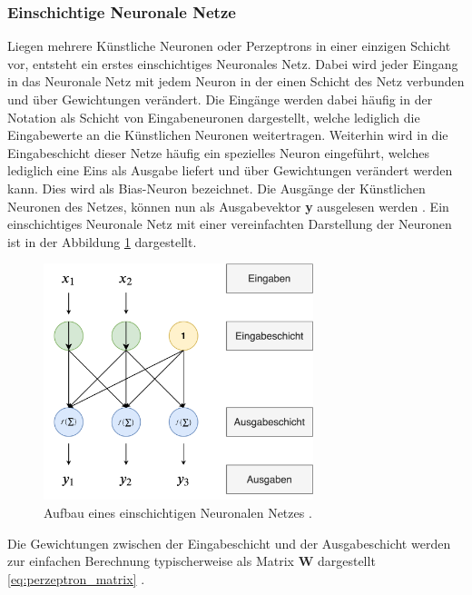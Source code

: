 \documentclass[11pt,bibliography=totocnumbered]{scrartcl}
\begin{document}
\subsubsection{Einschichtige Neuronale Netze}
Liegen mehrere Künstliche Neuronen oder Perzeptrons in einer einzigen Schicht vor, entsteht ein erstes einschichtiges Neuronales Netz. Dabei wird jeder Eingang in das Neuronale Netz mit jedem Neuron in der einen Schicht des Netz verbunden und über Gewichtungen verändert. Die Eingänge werden dabei häufig in der Notation als Schicht von Eingabeneuronen dargestellt, welche lediglich die Eingabewerte an die Künstlichen Neuronen weitertragen. Weiterhin wird in die Eingabeschicht dieser Netze häufig ein spezielles Neuron eingeführt, welches lediglich eine Eins als Ausgabe liefert und über Gewichtungen verändert werden kann. Dies wird als Bias-Neuron bezeichnet. Die Ausgänge der Künstlichen Neuronen des Netzes, können nun als Ausgabevektor \textbf{y} ausgelesen werden \cite[S.26]{BA}\cite[S.258]{MACHINE_LEARNING}. Ein einschichtiges Neuronale Netz mit einer vereinfachten Darstellung der Neuronen ist in der Abbildung \ref{fig:multi_neuron_perceptron} dargestellt.
\begin{figure}[H]
	\centering
	\includegraphics[width=0.7\textwidth]{multi_neuron_perceptron}
	\vspace*{-5mm}
	\caption[Einschichtiges Neuronales Netz]{Aufbau eines einschichtigen Neuronalen Netzes \cite[S.27]{BA}\cite[S.258]{MACHINE_LEARNING}.}
	\label{fig:multi_neuron_perceptron}
\end{figure}
\vspace*{-5mm}
Die Gewichtungen zwischen der Eingabeschicht und der Ausgabeschicht werden zur einfachen Berechnung typischerweise als Matrix \textbf{W} dargestellt \eqref{eq:perzeptron_matrix} \cite[S.26]{BA}\cite[S.258]{MACHINE_LEARNING}.
\end{document}
